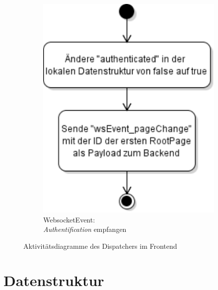 \begin{figure}[ht]
\begin{subfigure}[b]{0.30\textwidth}
      \includegraphics[width=\textwidth]{content/hauptteil/systemEntwurf/res/wsHandler/frontend/wsEvent_authentification.pdf}
      \caption{WebsocketEvent:\\\emph{Authentification} empfangen}
      \label{fig:aDDF:wsEvent_authentification}
  \end{subfigure}
     \caption[Aktivitätsdiagramme Dispatcher Frontend]{Aktivitätsdiagramme des Dispatchers im Frontend}
     \label{fig:activityDiagramDispatcherFrontend}
\end{figure}
\section{Datenstruktur}
